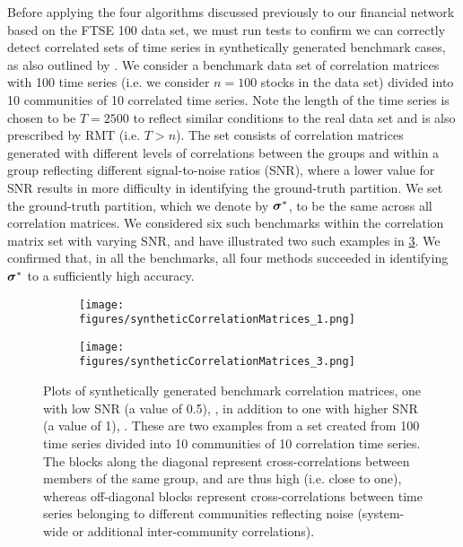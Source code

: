 Before applying the four algorithms discussed previously to our financial network based on the FTSE 100 data set, we must run tests to confirm we can correctly detect correlated sets of time series in synthetically generated benchmark cases, as also outlined by \cite{MG13}.
We consider a benchmark data set of correlation matrices with 100 time series (i.e. we consider $n = 100$ stocks in the data set) divided into 10 communities of 10 correlated time series.
Note the length of the time series is chosen to be $T=2500$ to reflect similar conditions to the real data set and is also prescribed by RMT (i.e. $T>n$).
The set consists of correlation matrices generated with different levels of correlations between the groups and within a group reflecting different signal-to-noise ratios (SNR), where a lower value for SNR results in more difficulty in identifying the ground-truth partition.
We set the ground-truth partition, which we denote by $\vecvar{\sigma}^{*}$, to be the same across all correlation matrices.
We considered six such benchmarks within the correlation matrix set with varying SNR, and have illustrated two such examples in \cref{fig:benchmarkCorrelationMatrices}.
We confirmed that, in all the benchmarks, all four methods succeeded in identifying $\vecvar{\sigma}^{*}$ to a sufficiently high accuracy.

\begin{figure}
	\centering
	\begin{subfigure}{.5\textwidth}
		\centering
		\texttt{[image: figures/syntheticCorrelationMatrices\_1.png]}
		\caption{}
		\label{fig:benchmarkCorrelationMatrix1}
	\end{subfigure}%
	\begin{subfigure}{.5\textwidth}
		\centering
		\texttt{[image: figures/syntheticCorrelationMatrices\_3.png]}
		\caption{}
		\label{fig:benchmarkCorrelationMatrix3}
	\end{subfigure}
	\caption[Plots of synthetically generated benchmark correlation matrices]{\label{fig:benchmarkCorrelationMatrices} Plots of synthetically generated benchmark correlation matrices, one with low SNR (a value of 0.5), , in addition to one with higher SNR (a value of 1), . These are two examples from a set created from 100 time series divided into 10 communities of 10 correlation time series. The blocks along the diagonal represent cross-correlations between members of the same group, and are thus high (i.e. close to one), whereas off-diagonal blocks represent cross-correlations between time series belonging to different communities reflecting noise (system-wide or additional inter-community correlations).}
\end{figure}

